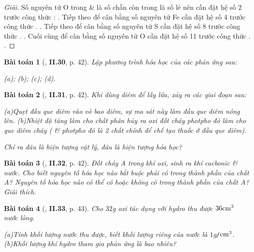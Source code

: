 \documentclass{article}
\numberwithin{equation}{section}
\newtheorem{baitoan}{Bài toán}
\begin{document}
\begin{proof}[Giải]
	Số nguyên tử O trong  \&  là số chẵn còn trong  là số lẻ nên cần đặt hệ số 2 trước công thức : . Tiếp theo để cân bằng số nguyên tử Fe cần đặt hệ số 4 trước công thức . . Tiếp theo để cân bằng số nguyên tử S cần đặt hệ số 8 trước công thức . . Cuối cùng để cân bằng số nguyên tử O cần đặt hệ số 11 trước công thức . .
\end{proof}

\begin{baitoan}[\cite{Truong_BTNC_Hoa_Hoc_8_2022}, \textbf{II.30}, p. 42]
	Lập phương trình hóa học của các phản ứng sau:
	
		(a)\emph{};
		(b)\emph{};
		(c)\emph{};
		(d)\emph{}.
	
\end{baitoan}

\begin{baitoan}[\cite{Truong_BTNC_Hoa_Hoc_8_2022}, \textbf{II.31}, p. 42]
	Khi dùng diêm để lấy lửa, xảy ra các giai đoạn sau:
	
		(a)Quẹt đầu que diêm vào vỏ bao diêm, sự ma sát này làm đầu que diêm nóng lên.
		(b)Nhiệt độ tăng làm cho chất \emph{} phân hủy ra oxi đốt cháy photpho đỏ làm cho que diêm cháy (\emph{} \& photpho đỏ là 2 chất chính để chế tạo thuốc ở đầu que diêm).
	
	Chỉ ra đâu là hiện tượng vật lý, đâu là hiện tượng hóa học?
\end{baitoan}

\begin{baitoan}[\cite{Truong_BTNC_Hoa_Hoc_8_2022}, \textbf{II.32}, p. 42]
	Đốt cháy A trong khí oxi, sinh ra khí cacbonic \& nước. Cho biết nguyên tố hóa học nào bắt buộc phải có trong thành phần của chất A? Nguyên tố hóa học nào có thể có hoặc không có trong thành phần của chất A? Giải thích.
\end{baitoan}

\begin{baitoan}[\cite{Truong_BTNC_Hoa_Hoc_8_2022}, \textbf{II.33}, p. 43]
	Cho $32$\emph{g} oxi tác dụng với hydro thu được $\rm36cm^3$ nước lỏng. 
	
		(a)Tính khối lượng nước thu được, biết khối lượng riêng của nước là $1$\emph{g\texttt{/}$\rm cm^3$}.
		(b)Khối lượng khí hydro tham gia phản ứng là bao nhiêu?
	
\end{baitoan}
\end{document}
